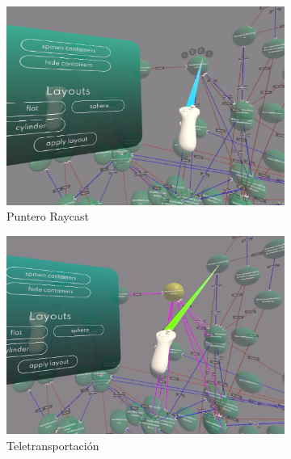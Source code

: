\begin{figure}[ht]
   \centering
   \begin{subfigure}{0.45\textwidth}
       \centering
       \includegraphics[width=\textwidth]{chapter2/figures/raycast.png}
       \caption{Puntero Raycast}
   \end{subfigure}
   \hfill
   \begin{subfigure}{0.45\textwidth}
       \centering
       \includegraphics[width=\textwidth]{chapter2/figures/teleport.png}
       \caption{Teletransportación}
   \end{subfigure}
   \\
   \begin{subfigure}{0.45\textwidth}
       \centering

\end{subfigure}
\end{figure}
